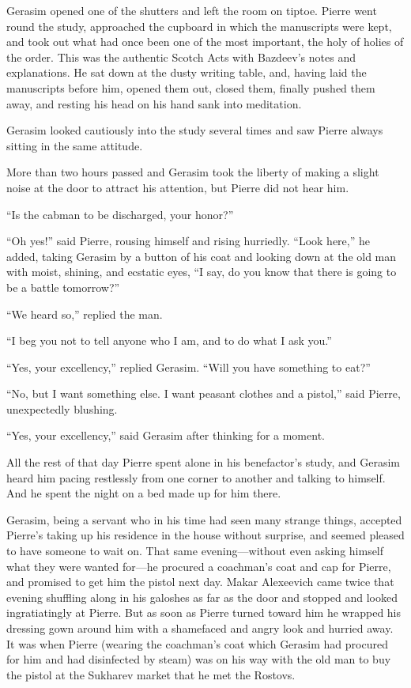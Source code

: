 Gerasim opened one of the shutters and left the room on
tiptoe. Pierre went round the study, approached the cupboard in
which the manuscripts were kept, and took out what had once been
one of the most important, the holy of holies of the order. This
was the authentic Scotch Acts with Bazdeev's notes and
explanations. He sat down at the dusty writing table, and, having
laid the manuscripts before him, opened them out, closed them,
finally pushed them away, and resting his head on his hand sank
into meditation.

Gerasim looked cautiously into the study several times and saw
Pierre always sitting in the same attitude.

More than two hours passed and Gerasim took the liberty of making
a slight noise at the door to attract his attention, but Pierre
did not hear him.

``Is the cabman to be discharged, your honor?''

``Oh yes!'' said Pierre, rousing himself and rising
hurriedly. ``Look here,'' he added, taking Gerasim by a button of
his coat and looking down at the old man with moist, shining, and
ecstatic eyes, ``I say, do you know that there is going to be a
battle tomorrow?''

``We heard so,'' replied the man.

``I beg you not to tell anyone who I am, and to do what I ask
you.''

``Yes, your excellency,'' replied Gerasim. ``Will you have
something to eat?''

``No, but I want something else. I want peasant clothes and a
pistol,'' said Pierre, unexpectedly blushing.

``Yes, your excellency,'' said Gerasim after thinking for a
moment.

All the rest of that day Pierre spent alone in his benefactor's
study, and Gerasim heard him pacing restlessly from one corner to
another and talking to himself. And he spent the night on a bed
made up for him there.

Gerasim, being a servant who in his time had seen many strange
things, accepted Pierre's taking up his residence in the house
without surprise, and seemed pleased to have someone to wait
on. That same evening---without even asking himself what they
were wanted for---he procured a coachman's coat and cap for
Pierre, and promised to get him the pistol next day. Makar
Alexeevich came twice that evening shuffling along in his
galoshes as far as the door and stopped and looked ingratiatingly
at Pierre. But as soon as Pierre turned toward him he wrapped his
dressing gown around him with a shamefaced and angry look and
hurried away. It was when Pierre (wearing the coachman's coat
which Gerasim had procured for him and had disinfected by steam)
was on his way with the old man to buy the pistol at the Sukharev
market that he met the Rostovs.

